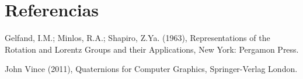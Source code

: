 \documentclass{article}
\theoremstyle{plain}
\theoremstyle{definition}
\theoremstyle{remark}
\begin{document}
\section{Referencias}

\begin{thebibliography}{9}

  Gelfand, I.M.; Minlos, R.A.; Shapiro, Z.Ya. (1963),
  Representations of the Rotation and Lorentz Groups and their Applications,
  New York: Pergamon Press.

  John Vince (2011),
  Quaternions for Computer Graphics,
  Springer-Verlag London.

\end{thebibliography}
\end{document}
